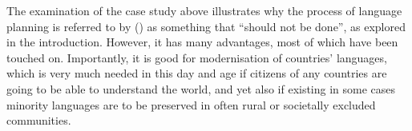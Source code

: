 \documentclass[12pt]{article}
\begin{document}
The examination of the case study above illustrates why the process of
language planning is referred to by \citeauthor{language-planning-detrimental}
(\citeyear{language-planning-detrimental}) as something that ``should not be
done'', as explored in the introduction. However, it has many
advantages, most of which have been touched on. Importantly, it is
good for modernisation of countries' languages, which is very much
needed in this day and age if citizens of any countries are going to
be able to understand the world, and yet also if existing in some
cases minority languages are to be preserved in often rural or
societally excluded communities.\\



\end{document}
